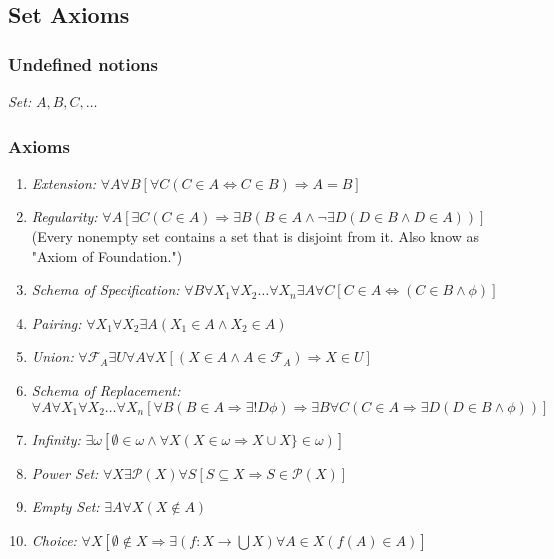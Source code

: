 \subsection{Set Axioms}\label{setaxioms}

\subsubsection{Undefined notions}
\emph{Set:} $A,B,C,\dots$

\subsubsection{Axioms}\label{statementofsetaxioms}
\begin{enumerate}
  \item \emph{Extension:} $\forall A \forall B [\forall C ( C \in A \Leftrightarrow C \in B ) \Rightarrow A = B ]$
  \item \emph{Regularity:} $\forall A [\exists C (C \in A) \Rightarrow \exists B ( B \in A \land \lnot \exists D (D \in B \land D \in A))]$ \newline
  {\small (Every nonempty set contains a set that is disjoint from it. Also know as "Axiom of Foundation.")}
  \item \emph{Schema of Specification:} $\forall B \forall X_1 \forall X_2 \dots \forall X_n \exists A \forall C [C \in A \Leftrightarrow ( C \in B \land \phi)]$
  \item \emph{Pairing:} $\forall X_1 \forall X_2 \exists A (X_1 \in A \land X_2 \in A)$
  \item \emph{Union:} $\forall \mathcal{F}_A \exists U \forall A \forall X [(X \in A \land A \in \mathcal{F}_A) \Rightarrow X \in U]$
  \item \emph{Schema of Replacement:} $\forall A \forall X_1 \forall X_2 \dots \forall X_n[\forall B(B \in A \Rightarrow \exists! D \phi) \Rightarrow \exists B \forall C (C \in A \Rightarrow \exists D(D \in B \land \phi))]$
  \item \emph{Infinity:} $\exists \omega [\emptyset \in \omega \land \forall X(X \in \omega \Rightarrow X \cup X\} \in \omega)]$
  \item \emph{Power Set:} $\forall X \exists \mathcal{P}(X) \forall S [S \subseteq X \Rightarrow S \in \mathcal{P}(X)]$
  \item \emph{Empty Set:} $\exists A \forall X (X \not\in A)$
  \item \emph{Choice:} $\forall X [\emptyset \not\in X \Rightarrow \exists (f:X \rightarrow \bigcup X) \forall A \in X (f(A) \in A)]$
\end{enumerate}

